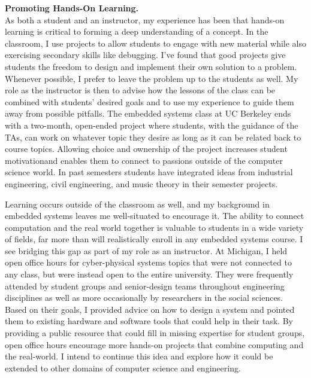\documentclass[12pt]{article} %
\begin{document}
\textbf{\textsf{\large Promoting Hands-On Learning.}}\\
As both a student and an instructor, my experience has been that hands-on
learning is critical to forming a deep understanding of a concept. In the
classroom, I use projects to allow students to engage with new material while
also exercising secondary skills like debugging. I've found that good projects
give students the freedom to design and implement their own solution to a
problem. Whenever possible, I prefer to leave the problem up to the students as
well. My role as the instructor is then to advise how the lessons of the class
can be combined with students' desired goals and to use my experience to guide
them away from possible pitfalls. The embedded systems class at UC Berkeley
ends with a two-month, open-ended project where students, with the guidance of
the TAs, can work on whatever topic they desire as long as it can be related
back to course topics. Allowing choice and ownership of the project increases
student motivation\footnotemark and enables them to connect to passions outside
of the computer science world. In past semesters students have integrated ideas
from industrial engineering, civil engineering, and music theory in their
semester projects.


Learning occurs outside of the classroom as well, and my background in embedded
systems leaves me well-situated to encourage it. The ability to connect
computation and the real world together is valuable to students in a wide
variety of fields, far more than will realistically enroll in any embedded
systems course. I see bridging this gap as part of my role as an instructor. At
Michigan, I held open office hours for cyber-physical systems topics that were
not connected to any class, but were instead open to the entire university.
They were frequently attended by student groups and senior-design teams
throughout engineering disciplines as well as more occasionally by researchers
in the social sciences. Based on their goals, I provided advice on how to
design a system and pointed them to existing hardware and software tools that
could help in their task. By providing a public resource that could fill in
missing expertise for student groups, open office hours encourage more hands-on
projects that combine computing and the real-world. I intend to continue this
idea and explore how it could be extended to other domains of computer science
and engineering.
\end{document}
